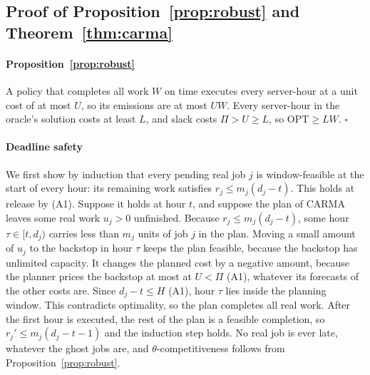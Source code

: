 \subsection{Proof of Proposition~\ref{prop:robust} and Theorem~\ref{thm:carma}}

\paragraph{Proposition~\ref{prop:robust}} A policy that completes all work $W$ on time executes every server-hour at a unit cost of at most $U$, so its emissions are at most $UW$. Every server-hour in the oracle's solution costs at least $L$, and slack costs $\Pi>U\ge L$, so $\mathrm{OPT}\ge LW$. \hfill$\square$

\paragraph{Deadline safety} We first show by induction that every pending real job $j$ is window-feasible at the start of every hour: its remaining work satisfies $r_j\le m_j(d_j-t)$. This holds at release by (A1). Suppose it holds at hour $t$, and suppose the plan of CARMA leaves some real work $u_j>0$ unfinished. Because $r_j\le m_j(d_j-t)$, some hour $\tau\in[t,d_j)$ carries less than $m_j$ units of job $j$ in the plan. Moving a small amount of $u_j$ to the backstop in hour $\tau$ keeps the plan feasible, because the backstop has unlimited capacity. It changes the planned cost by a negative amount, because the planner prices the backstop at most at $U<\Pi$ (A1), whatever its forecasts of the other costs are. Since $d_j-t\le H$ (A1), hour $\tau$ lies inside the planning window. This contradicts optimality, so the plan completes all real work. After the first hour is executed, the rest of the plan is a feasible completion, so $r_j'\le m_j(d_j-t-1)$ and the induction step holds. No real job is ever late, whatever the ghost jobs are, and $\theta$-competitiveness follows from Proposition~\ref{prop:robust}.

